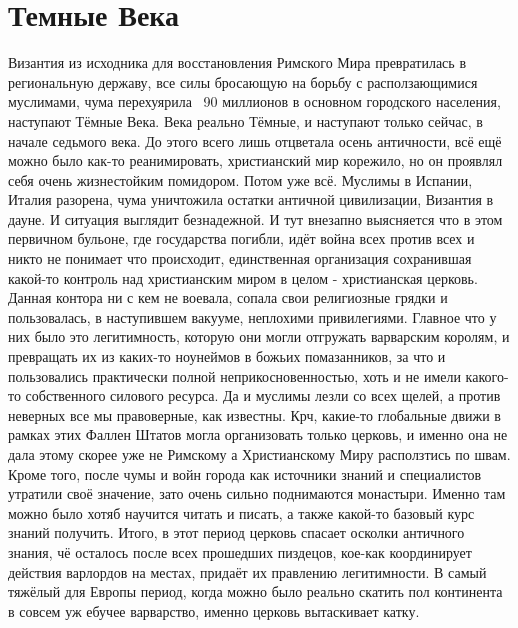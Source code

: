 \section{Темные Века}

Византия из исходника для восстановления Римского Мира превратилась в региональную державу, все силы бросающую на борьбу с расползающимися муслимами, чума перехуярила ~90 миллионов в основном городского населения, наступают Тёмные Века. Века реально Тёмные, и наступают только сейчас, в начале седьмого века. До этого всего лишь отцветала осень античности, всё ещё можно было как-то реанимировать, христианский мир корежило, но он проявлял себя очень жизнестойким помидором. Потом уже всё. Муслимы в Испании, Италия разорена, чума уничтожила остатки античной цивилизации, Византия в дауне. И ситуация выглядит безнадежной. И тут внезапно выясняется что в этом первичном бульоне, где государства погибли, идёт война всех против всех и никто не понимает что происходит, единственная организация сохранившая какой-то контроль над христианским миром в целом - христианская церковь. Данная контора ни с кем не воевала, сопала свои религиозные грядки и пользовалась, в наступившем вакууме, неплохими привилегиями. Главное что у них было это легитимность, которую они могли отгружать варварским королям, и превращать их из каких-то ноунеймов в божьих помазанников, за что и пользовались практически полной неприкосновенностью, хоть и не имели какого-то собственного силового ресурса. Да и муслимы лезли со всех щелей, а против неверных все мы правоверные, как известны. Крч, какие-то глобальные движи в рамках этих Фаллен Штатов могла организовать только церковь, и именно она не дала этому скорее уже не Римскому а Христианскому Миру расползтись по швам. Кроме того, после чумы и войн города как источники знаний и специалистов утратили своё значение, зато очень сильно поднимаются монастыри. Именно там можно было хотяб научится читать и писать, а также какой-то базовый курс знаний получить. Итого, в этот период церковь спасает осколки античного знания, чё осталось после всех прошедших пиздецов, кое-как координирует действия варлордов на местах, придаёт их правлению легитимности. В самый тяжёлый для Европы период, когда можно было реально скатить пол континента в совсем уж ебучее варварство, именно церковь вытаскивает катку. 
